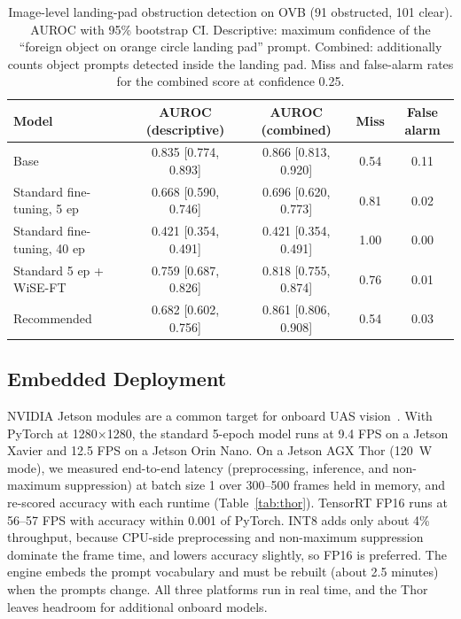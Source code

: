 \documentclass[conf]{new-aiaa}
\begin{document}
\begin{table}[hbt!]
\caption{Image-level landing-pad obstruction detection on OVB (91 obstructed, 101 clear).
         AUROC with 95\% bootstrap CI. Descriptive: maximum confidence of the ``foreign object
         on orange circle landing pad'' prompt. Combined: additionally counts object prompts
         detected inside the landing pad. Miss and false-alarm rates for the combined score at
         confidence 0.25.}
\label{tab:obstruction}
\centering
\begin{tabular}{lcccc}
\hline
\textbf{Model} & \textbf{AUROC (descriptive)} & \textbf{AUROC (combined)} & \textbf{Miss} & \textbf{False alarm} \\
\hline
Base             & 0.835 [0.774, 0.893] & 0.866 [0.813, 0.920] & 0.54 & 0.11 \\
Standard fine-tuning, 5 ep  & 0.668 [0.590, 0.746] & 0.696 [0.620, 0.773] & 0.81 & 0.02 \\
Standard fine-tuning, 40 ep & 0.421 [0.354, 0.491] & 0.421 [0.354, 0.491] & 1.00 & 0.00 \\
Standard 5 ep + WiSE-FT     & 0.759 [0.687, 0.826] & 0.818 [0.755, 0.874] & 0.76 & 0.01 \\
Recommended      & 0.682 [0.602, 0.756] & 0.861 [0.806, 0.908] & 0.54 & 0.03 \\
\hline
\end{tabular}
\end{table}

\subsection{Embedded Deployment}

NVIDIA Jetson modules are a common target for onboard UAS vision~\cite{mittal2019survey}.
With PyTorch at 1280$\times$1280, the standard 5-epoch model runs at 9.4 FPS on a Jetson Xavier
and 12.5 FPS on a Jetson Orin Nano. On a Jetson AGX Thor (120~W mode), we measured end-to-end
latency (preprocessing, inference, and non-maximum suppression) at batch size 1 over 300--500
frames held in memory, and re-scored accuracy with each runtime (Table~\ref{tab:thor}).
TensorRT FP16 runs at 56--57 FPS with accuracy within 0.001 of PyTorch. INT8 adds only about
4\% throughput, because CPU-side preprocessing and non-maximum suppression dominate the frame
time, and lowers accuracy slightly, so FP16 is preferred. The engine embeds the prompt
vocabulary and must be rebuilt (about 2.5 minutes) when the prompts change. All three platforms
run in real time, and the Thor leaves headroom for additional onboard models.
\end{document}
